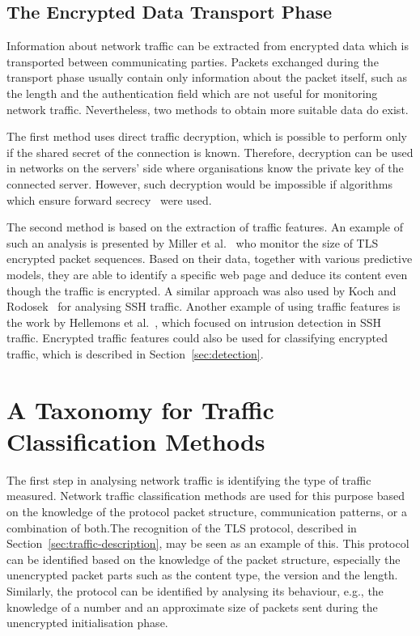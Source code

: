 \subsection{The Encrypted Data Transport Phase}

Information about network traffic can be extracted from encrypted data which is transported between communicating parties. Packets exchanged during the transport phase usually contain only information about the packet itself, such as the length and the authentication field which are not useful for monitoring network traffic. Nevertheless, two methods to obtain more suitable data do exist.

The first method uses direct traffic decryption, which is possible to perform only if the shared secret of the connection is known. Therefore, decryption can be used in networks on the servers' side where organisations know the private key of the connected server. However, such decryption would be impossible if algorithms which ensure forward secrecy~\cite{Huang-2014-tls-forward-secrecy} were used. 

The second method is based on the extraction of traffic features. An example of such an analysis is presented by Miller et al.~\cite{Miller-2014-https-decrypt} who monitor the size of TLS encrypted packet sequences. Based on their data, together with various predictive models, they are able to identify a specific web page and deduce its content even though the traffic is encrypted. A similar approach was also used by Koch and Rodosek~\cite{Koch-2010-Command} for analysing SSH traffic. Another example of using traffic features is the work by Hellemons et al.~\cite{hellmons-2012-sshcure}, which focused on intrusion detection in SSH traffic. Encrypted traffic features could also be used for classifying encrypted traffic, which is described in Section~\ref{sec:detection}.




\section{A Taxonomy for Traffic Classification Methods} \label{sec:taxonomy}

The first step in analysing network traffic is identifying the type of traffic measured. Network traffic classification methods are used for this purpose based on the knowledge of the protocol packet structure, communication patterns, or a combination of both.The recognition of the TLS protocol, described in Section~\ref{sec:traffic-description}, may be seen as an example of this. This protocol can be identified based on the knowledge of the packet structure, especially the unencrypted packet parts such as the content type, the version and the length. Similarly, the protocol can be identified by analysing its behaviour, e.g., the knowledge of a number and an approximate size of packets sent during the unencrypted initialisation phase.

